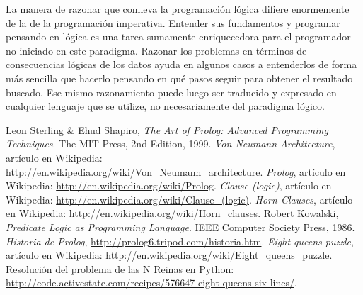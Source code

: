 \documentclass[12pt,titlepage]{article}
\begin{document}
La manera de razonar que conlleva la programación lógica difiere enormemente de la de la programación imperativa. Entender sus fundamentos y programar pensando en lógica es una tarea sumamente enriquecedora para el programador no iniciado en este paradigma. Razonar los problemas en términos de consecuencias lógicas de los datos ayuda en algunos casos a entenderlos de forma más sencilla que hacerlo pensando en qué pasos seguir para obtener el resultado buscado. Ese mismo razonamiento puede luego ser traducido y expresado en cualquier lenguaje que se utilize, no necesariamente del paradigma lógico.

\clearpage
\begin{thebibliography}{99}
     Leon Sterling \& Ehud Shapiro, \emph{The Art of Prolog: Advanced Programming Techniques}. The MIT Press, 2nd Edition, 1999.
     \emph{Von Neumann Architecture}, artículo en Wikipedia: \url{http://en.wikipedia.org/wiki/Von\_Neumann\_architecture}.
     \emph{Prolog}, artículo en Wikipedia: \url{http://en.wikipedia.org/wiki/Prolog}.
     \emph{Clause (logic)}, artículo en Wikipedia: \url{http://en.wikipedia.org/wiki/Clause_(logic)}.
     \emph{Horn Clauses}, artículo en Wikipedia: \url{http://en.wikipedia.org/wiki/Horn_clauses}.
     Robert Kowalski, \emph{Predicate Logic as Programming Language}. IEEE Computer Society Press, 1986.
     \emph{Historia de Prolog}, \url{http://prolog6.tripod.com/historia.htm}.
     \emph{Eight queens puzzle}, artículo en Wikipedia: \url{http://en.wikipedia.org/wiki/Eight_queens_puzzle}.
     Resolución del problema de las N Reinas en Python: \url{http://code.activestate.com/recipes/576647-eight-queens-six-lines/}.
\end{thebibliography} 

\end{document}
